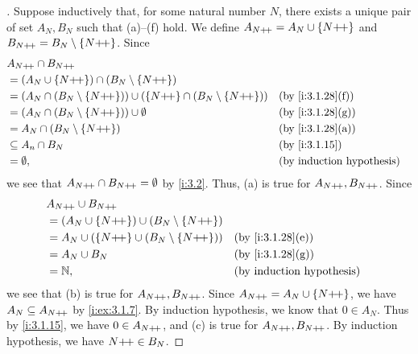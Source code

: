 \begin{proof}[]
  Suppose inductively that, for some natural number \(N\), there exists a unique pair of set \(A_N, B_N\) such that (a)--(f) hold.
  We define \(A_{N{+}\!{+}} = A_N \cup \left\lbrace N{+}\!{+}\right\rbrace\) and \(B_{N{+}\!{+}} = B_N \setminus \left\lbrace N{+}\!{+}\right\rbrace\).
  Since
  \begin{align*}
     & A_{N\pp} \cap B_{N\pp}                                                                                          \\
     & = (A_N \cup \set{N\pp}) \cap (B_N \setminus \set{N\pp})                                                         \\
     & = (A_N \cap (B_N \setminus \set{N\pp})) \cup (\set{N\pp} \cap (B_N \setminus \set{N\pp})) &  & \by{i:3.1.28}[f] \\
     & = (A_N \cap (B_N \setminus \set{N\pp})) \cup \emptyset                                    &  & \by{i:3.1.28}[g] \\
     & = A_N \cap (B_N \setminus \set{N\pp})                                                     &  & \by{i:3.1.28}[a] \\
     & \subseteq A_n \cap B_N                                                                    &  & \by{i:3.1.15}    \\
     & = \emptyset,                                                                              &  & \byIH
  \end{align*}
  we see that \(A_{N{+}\!{+}} \cap B_{N{+}\!{+}} = \emptyset\) by \cref{i:3.2}.
  Thus, (a) is true for \(A_{N{+}\!{+}}, B_{N{+}\!{+}}\).
  Since
  \begin{align*}
     & A_{N\pp} \cup B_{N\pp}                                                        \\
     & = (A_N \cup \set{N\pp}) \cup (B_N \setminus \set{N\pp})                       \\
     & = A_N \cup (\set{N\pp} \cup (B_N \setminus \set{N\pp})) &  & \by{i:3.1.28}[e] \\
     & = A_N \cup B_N                                          &  & \by{i:3.1.28}[g] \\
     & = \N,                                                   &  & \byIH
  \end{align*}
  we see that (b) is true for \(A_{N{+}\!{+}}, B_{N{+}\!{+}}\).
  Since \(A_{N{+}\!{+}} = A_N \cup \left\lbrace N{+}\!{+}\right\rbrace\), we have \(A_N \subseteq A_{N{+}\!{+}}\) by \cref{i:ex:3.1.7}.
  By induction hypothesis, we know that \(0 \in A_N\).
  Thus by \cref{i:3.1.15}, we have \(0 \in A_{N{+}\!{+}}\), and (c) is true for \(A_{N{+}\!{+}}, B_{N{+}\!{+}}\).
  By induction hypothesis, we have \(N{+}\!{+} \in B_N\).

\end{proof}
